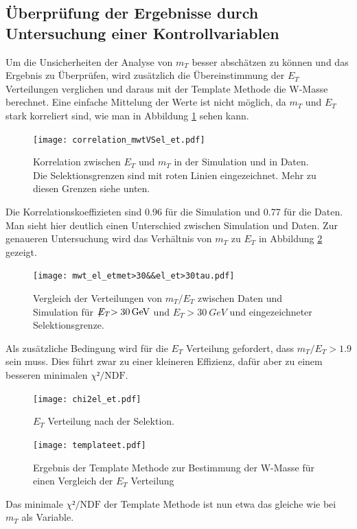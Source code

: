 \documentclass[a4paper,12pt]{article}
\newcommand{\met}{\ensuremath{\not\mathrel{E}}_T}
\begin{document}
\subsection{Überprüfung der Ergebnisse durch Untersuchung einer Kontrollvariablen}
Um die Unsicherheiten der Analyse von $m_{T}$ besser abschätzen zu können und das Ergebnis zu Überprüfen, wird zusätzlich
die Übereinstimmung der $E_T$ Verteilungen verglichen und daraus mit der Template Methode die W-Masse
berechnet. Eine einfache Mittelung der Werte ist nicht möglich, da $m_T$ und $E_T$ stark korreliert
sind, wie man in Abbildung \ref{fig:correlation} sehen kann.
\begin{figure}[htb]
	\centering
	\texttt{[image: correlation\_mwtVSel\_et.pdf]}\\
	\caption{Korrelation zwischen $E_T$ und $m_T$ in der Simulation und in Daten. Die
		Selektionsgrenzen sind mit roten Linien eingezeichnet. Mehr zu diesen Grenzen siehe
	unten.}
	\label{fig:correlation}
\end{figure}

Die Korrelationskoeffizieten sind 0.96 für die Simulation und 0.77 für die Daten. Man sieht hier
deutlich einen Unterschied  zwischen Simulation und Daten. Zur genaueren Untersuchung wird das
Verhältnis von $m_T$ zu $E_T$ in Abbildung \ref{fig:verhaeltnis} gezeigt.

\begin{figure}[htb]
	\centering
	\texttt{[image: mwt\_el\_etmet>30\&\&el\_et>30tau.pdf]}
	\caption{Vergleich der Verteilungen von $m_T/E_T$ zwischen Daten und Simulation für
		$\met>\SI{30}{GeV}$ und $E_T>\SI{30}{GeV}$ und eingezeichneter Selektionsgrenze.}
	\label{fig:verhaeltnis}
\end{figure}

Als zusätzliche Bedingung wird für die $E_T$ Verteilung gefordert, dass $m_T/E_T>1.9$ sein muss.
Dies führt zwar zu einer kleineren Effizienz, dafür aber zu einem besseren minimalen $χ²/\text{NDF}$.

\begin{figure}[htb]
	\centering
	\texttt{[image: chi2el\_et.pdf]}
	\caption{$E_{T}$ Verteilung nach der Selektion. }
	\label{fig:etaftercut}
\end{figure}


\begin{figure}[htb]
	\centering
	\texttt{[image: templateet.pdf]}
	\caption{Ergebnis der Template Methode zur Bestimmung der W-Masse für einen Vergleich der $E_{T}$ Verteilung}
	\label{fig:chiet}
\end{figure}
Das minimale $χ²/\text{NDF}$ der Template Methode ist nun etwa das gleiche wie bei $m_T$ als
Variable.
\end{document}

